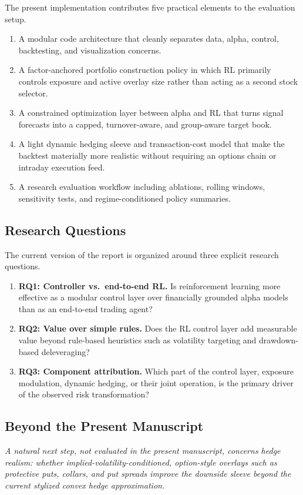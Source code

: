 \documentclass[11pt]{article}
\begin{document}
The present implementation contributes five practical elements to the evaluation
setup.
\begin{enumerate}[leftmargin=1.5em, itemsep=2pt, topsep=4pt]
\item A modular code architecture that cleanly separates data, alpha, control,
      backtesting, and visualization concerns.
\item A factor-anchored portfolio construction policy in which RL primarily
      controls exposure and active overlay size rather than acting as a second
      stock selector.
\item A constrained optimization layer between alpha and RL that turns signal
      forecasts into a capped, turnover-aware, and group-aware target book.
\item A light dynamic hedging sleeve and transaction-cost model that make the
      backtest materially more realistic without requiring an options chain or
      intraday execution feed.
\item A research evaluation workflow including ablations, rolling windows,
      sensitivity tests, and regime-conditioned policy summaries.
\end{enumerate}

\subsection{Research Questions}

The current version of the report is organized around three explicit research
questions.
\begin{enumerate}[leftmargin=1.5em, itemsep=2pt, topsep=4pt]
\item \textbf{RQ1: Controller vs.\ end-to-end RL.} Is reinforcement learning
      more effective as a modular control layer over financially grounded alpha
      models than as an end-to-end trading agent?
\item \textbf{RQ2: Value over simple rules.} Does the RL control layer add
      measurable value beyond rule-based heuristics such as volatility targeting
      and drawdown-based deleveraging?
\item \textbf{RQ3: Component attribution.} Which part of the control layer,
      exposure modulation, dynamic hedging, or their joint operation, is the
      primary driver of the observed risk transformation?
\end{enumerate}

\subsection*{Beyond the Present Manuscript}
\textit{A natural next step, not evaluated in the present manuscript, concerns
hedge realism: whether implied-volatility-conditioned, option-style overlays
such as protective puts, collars, and put spreads improve the downside sleeve
beyond the current stylized convex hedge approximation.}
\end{document}
